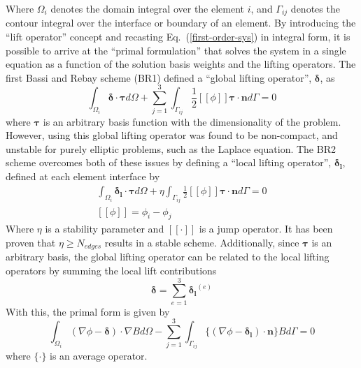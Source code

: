 \documentclass[a4paper]{article}
\newcommand{\eref}[1]{Eq.~(\ref{#1})}
\newcommand{\dint}[1]{\int_{\Omega_i}{#1 d\Omega}}
\newcommand{\sint}[1]{\int_{\Gamma_{ij}}{#1 d\Gamma}}
\newcommand{\average}[1]{\ensuremath{\{#1\}} }
\newcommand{\jump}[1]{\ensuremath{[\![#1]\!]} }
\newcommand{\vbasis}{\boldsymbol{\tau}}
\newcommand{\glift}{\boldsymbol{\delta}}
\newcommand{\llift}{\boldsymbol{\delta_l}}
\newcommand{\unitn}{\mathbf{n}}
\begin{document}
Where $\Omega_i$ denotes the domain integral over the element $i$, and
$\Gamma_{ij}$ denotes the contour integral over the interface or boundary of an
element.
By introducing the ``lift operator'' concept and recasting
\eref{first-order-sys} in integral form, it is possible to arrive at the
``primal formulation'' that solves the system in a single equation as a function
of the solution basis weights and the lifting operators.  The first Bassi and
Rebay scheme (BR1) defined a ``global lifting operator'', $\glift$, as
\begin{equation}
  \dint{\glift \cdot \vbasis} + \sum_{j=1}^3\sint{\frac{1}{2} \jump{\phi}
  \vbasis \cdot \unitn} = 0
  \label{global-lift-def}
\end{equation}
where $\vbasis$ is an arbitrary basis function with the dimensionality of the
problem. However, using this global lifting operator was found to be
non-compact, and unstable for purely elliptic problems, such as the Laplace
equation. The BR2 scheme overcomes both of these issues by defining a ``local
lifting operator'', $\llift$, defined at each element interface by
\begin{equation}
  \begin{gathered}
    \dint{\llift \cdot \vbasis} + \eta\sint{\frac{1}{2} \jump{\phi} \vbasis
    \cdot \unitn} = 0 \\
    \jump{\phi} = \phi_i - \phi_j
  \end{gathered}
  \label{local-lift-def}
\end{equation}
Where $\eta$ is a stability parameter and $\jump{\cdot}$ is a jump operator.  It
has been proven that $\eta \geq N_{edges}$ results in a stable scheme.
Additionally, since $\vbasis$ is an arbitrary basis, the global lifting operator
can be related to the local lifting operators by summing the local lift
contributions
\begin{equation}
  \glift = \sum_{e=1}^3{\llift^{(e)}}
  \label{local-global-relation}
\end{equation}
With this, the primal form is given by
\begin{equation}
  \dint{(\nabla \phi - \glift)\cdot \nabla B} -
  \sum_{j=1}^3\sint{\average{(\nabla \phi - \llift)\cdot\unitn}B} = 0
  \label{primal-form}
\end{equation}
where $\average{\cdot}$ is an average operator.
\end{document}
